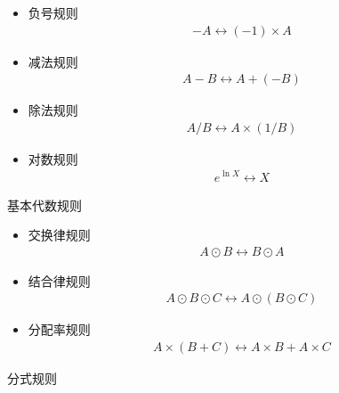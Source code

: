 \begin{itemize}
  \item {\kaishu 负号规则} 
  \begin{gather*}
  -A \longleftrightarrow (-1) \times A 
  \end{gather*}

  \item {\kaishu 减法规则} 
  \begin{gather*}
  A - B \longleftrightarrow A + (-B) 
  \end{gather*}

  \item {\kaishu 除法规则} 
  \begin{gather*}
  A / B \longleftrightarrow A \times (1 / B) 
  \end{gather*}

  \item {\kaishu 对数规则} 
  \begin{gather*}
  e^{\ln X} \longleftrightarrow X  
  \end{gather*}
\end{itemize}

\vspace{1mm}
\begin{center}
{\kaishu{} 基本代数规则}
\end{center}
\vspace{1mm}

\begin{itemize}
  \item {\kaishu 交换律规则} 
  \begin{gather*}
  A \odot B \longleftrightarrow B \odot A  
  \end{gather*}

  \item {\kaishu 结合律规则} 
  \begin{gather*}
  A \odot B \odot C \longleftrightarrow A \odot (B \odot C) 
  \end{gather*}

  \item {\kaishu 分配率规则} 
  \begin{gather*}
  A \times (B + C) \longleftrightarrow A \times B + A \times C 
  \end{gather*}
\end{itemize}

\vspace{1mm}
\begin{center}
{\kaishu{} 分式规则}
\end{center}
\vspace{1mm}

